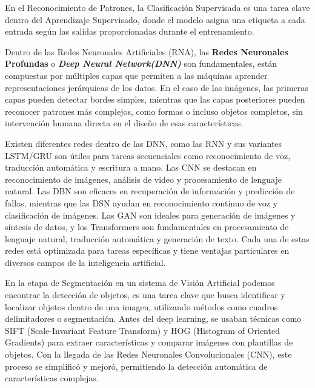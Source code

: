 En el Reconocimiento de Patrones, la Clasificación Supervisada es una tarea clave dentro del Aprendizaje Supervisado, donde el modelo asigna una etiqueta a cada entrada según las salidas proporcionadas durante el entrenamiento.

Dentro de las Redes Neuronales Artificiales (RNA), las \textbf{Redes Neuronales Profundas} o \textbf{\textit{Deep Neural Network(DNN)}} son fundamentales, están compuestas por múltiples capas que permiten a las máquinas aprender representaciones jerárquicas de los datos. En el caso de las imágenes, las primeras capas pueden detectar bordes simples, mientras que las capas posteriores pueden reconocer patrones más complejos, como formas o incluso objetos completos, sin intervención humana directa en el diseño de esas características\cite{centeno2019deep}.

Existen diferentes redes dentro de las DNN, como las RNN y sus variantes LSTM/GRU son útiles para tareas secuenciales como reconocimiento de voz, traducción automática y escritura a mano. Las CNN se destacan en reconocimiento de imágenes, análisis de video y procesamiento de lenguaje natural. Las DBN son eficaces en recuperación de información y predicción de fallas, mientras que las DSN ayudan en reconocimiento continuo de voz y clasificación de imágenes. Las GAN son ideales para generación de imágenes y síntesis de datos, y los Transformers son fundamentales en procesamiento de lenguaje natural, traducción automática y generación de texto. Cada una de estas redes está optimizada para tareas específicas y tiene ventajas particulares en diversos campos de la inteligencia artificial\cite{centeno2019deep}.

En la etapa de Segmentación en un sistema de Visión Artificial podemos encontrar la detección de objetos, es una tarea clave que busca identificar y localizar objetos dentro de una imagen, utilizando métodos como cuadros delimitadores o segmentación. Antes del deep learning, se usaban técnicas como  SIFT (Scale-Invariant Feature Transform) y HOG (Histogram of Oriented Gradients) para extraer características y comparar imágenes con plantillas de objetos. Con la llegada de las Redes Neuronales Convolucionales (CNN), este proceso se simplificó y mejoró, permitiendo la detección automática de características complejas\cite{sanchez2020evaluacion}.

